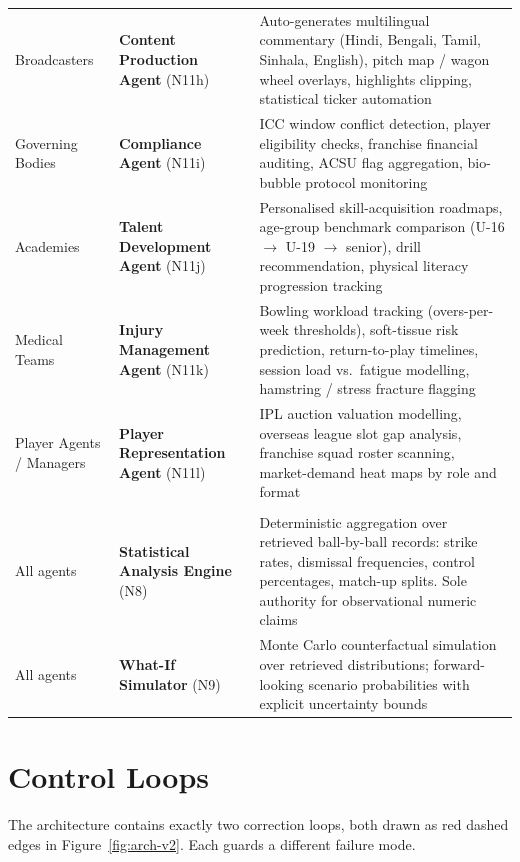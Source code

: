 \documentclass[11pt,a4paper]{article}
\begin{document}
\begin{center}
\begin{tabular}{@{}>{\raggedright\arraybackslash}p{2.4cm}
                  >{\raggedright\arraybackslash}p{3.2cm}
                  >{\raggedright\arraybackslash}p{9.0cm}@{}}
Broadcasters & \textbf{Content Production Agent} (N11h) & Auto-generates multilingual commentary (Hindi, Bengali, Tamil, Sinhala, English), pitch map / wagon wheel overlays, highlights clipping, statistical ticker automation \\
Governing Bodies & \textbf{Compliance Agent} (N11i) & ICC window conflict detection, player eligibility checks, franchise financial auditing, ACSU flag aggregation, bio-bubble protocol monitoring \\
Academies & \textbf{Talent Development Agent} (N11j) & Personalised skill-acquisition roadmaps, age-group benchmark comparison (U-16 $\rightarrow$ U-19 $\rightarrow$ senior), drill recommendation, physical literacy progression tracking \\
Medical Teams & \textbf{Injury Management Agent} (N11k) & Bowling workload tracking (overs-per-week thresholds), soft-tissue risk prediction, return-to-play timelines, session load vs.\ fatigue modelling, hamstring / stress fracture flagging \\
Player Agents / Managers & \textbf{Player Representation Agent} (N11l) & IPL auction valuation modelling, overseas league slot gap analysis, franchise squad roster scanning, market-demand heat maps by role and format \\
\midrule
\multicolumn{3}{@{}l@{}}{\textbf{Shared analytical services (no dedicated stakeholder)}} \\
\midrule
All agents & \textbf{Statistical Analysis Engine} (N8) & Deterministic aggregation over retrieved ball-by-ball records: strike rates, dismissal frequencies, control percentages, match-up splits. Sole authority for observational numeric claims \\
All agents & \textbf{What-If Simulator} (N9) & Monte Carlo counterfactual simulation over retrieved distributions; forward-looking scenario probabilities with explicit uncertainty bounds \\
\bottomrule
\end{tabular}
\label{tab:roster}
\end{center}

\section{Control Loops}

The architecture contains exactly two correction loops, both drawn as red dashed
edges in Figure~\ref{fig:arch-v2}. Each guards a different failure mode.
\end{document}
